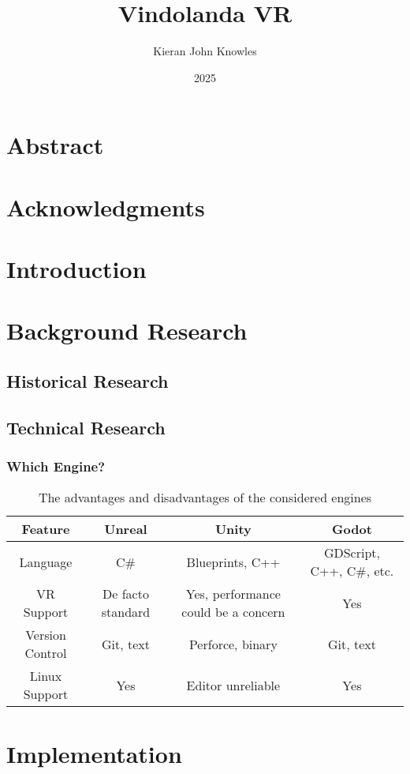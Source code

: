 \documentclass[12pt, a4paper]{report}
\title{Vindolanda VR}
\author{Kieran John Knowles}
\date{2025}
\begin{document}
\maketitle

\chapter*{Abstract}

\chapter*{Acknowledgments}

\tableofcontents
\listoftables
\listoffigures


\chapter{Introduction}

\chapter{Background Research}

\section{Historical Research}

\section{Technical Research}

\subsection{Which Engine?}

\begin{table}
\caption{The advantages and disadvantages of the considered engines}
\begin{tabulary}{\textwidth}{cCCC}\toprule
Feature & Unreal & Unity & Godot \\\midrule

Language & C\# & Blueprints, C++ & GDScript, C++, C\#, etc. \\
VR Support & De facto standard & Yes, performance could be a concern & Yes \\
Version Control & Git, text & Perforce, binary & Git, text \\
Linux Support & Yes & Editor unreliable & Yes \\

\bottomrule\end{tabulary}
\end{table}

\chapter{Implementation}


\todos
\end{document}
